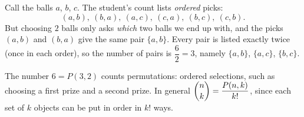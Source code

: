 Call the balls $a$, $b$, $c$. The student's count lists \emph{ordered} picks:
\[
(a,b),\ (b,a),\ (a,c),\ (c,a),\ (b,c),\ (c,b).
\]
But choosing $2$ balls only asks \emph{which} two balls we end up with, and the picks $(a,b)$ and $(b,a)$ give the same pair $\{a,b\}$. Every pair is listed exactly twice (once in each order), so the number of pairs is $\dfrac{6}{2}=\boxed{3}$, namely $\{a,b\}$, $\{a,c\}$, $\{b,c\}$.

The number $6=P(3,2)$ counts permutations: ordered selections, such as choosing a first prize and a second prize. In general $\dbinom{n}{k}=\dfrac{P(n,k)}{k!}$, since each set of $k$ objects can be put in order in $k!$ ways.
